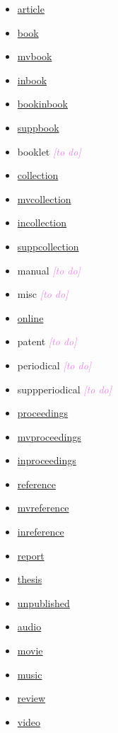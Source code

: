 \documentclass[extrafontsizes,11pt,a4paper,oneside]{memoir}
\newcommand*{\aside}[1]{\textcolor{violet}{\emph{[#1]}}}
\begin{document}
\begin{multicols}{2}
  \begin{itemize}\firmlist
    \item\hyperref[sec:article]{article}
    \item\hyperref[sec:book]{book}
    \item\hyperref[sec:book]{mvbook}
    \item\hyperref[sec:inx]{inbook}
    \item\hyperref[sec:inx]{bookinbook}
    \item\hyperref[sec:inx]{suppbook}
    \item booklet \aside{to do}
    \item\hyperref[sec:book]{collection}
    \item\hyperref[sec:book]{mvcollection}
    \item\hyperref[sec:inx]{incollection}
    \item\hyperref[sec:inx]{suppcollection}
    \item manual \aside{to do}
    \item misc \aside{to do}
    \item\hyperref[sec:electronic]{online}
    \item patent \aside{to do}
    \item periodical \aside{to do}
    \item suppperiodical \aside{to do}
    \item\hyperref[sec:proceedings]{proceedings}
    \item\hyperref[sec:proceedings]{mvproceedings}
    \item\hyperref[sec:inproceedings]{inproceedings}
    \item\hyperref[sec:book]{reference}
    \item\hyperref[sec:book]{mvreference}
    \item\hyperref[sec:inx]{inreference}
    \item\hyperref[sec:report]{report}
    \item\hyperref[sec:thesis]{thesis}
    \item\hyperref[sec:unpublished]{unpublished}
    \item\hyperref[sec:audiovideo]{audio}
    \item\hyperref[sec:audiovideo]{movie}
    \item\hyperref[sec:audiovideo]{music}
    \item\hyperref[sec:article]{review}
    \item\hyperref[sec:audiovideo]{video}
  \end{itemize}
\end{multicols}
\end{document}
